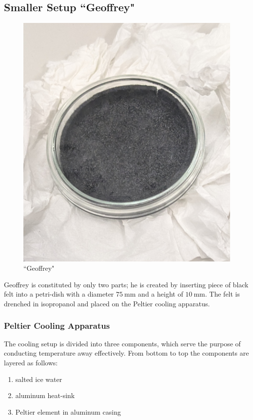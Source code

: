 \documentclass[10pt,a4paper]{article}
\begin{document}
\subsection{Smaller Setup ``Geoffrey"}
\begin{figure}
    \vspace{-\baselineskip}
    \includegraphics[width=1\linewidth]{images/Geoffrey top down.png}
    \caption{``Geoffrey"}
    \label{fig:geoffrey}
\end{figure}

Geoffrey is constituted by only two parts; he is created by inserting piece of black felt into a petri-dish with a diameter \(\qty{75}{\milli\meter}\) and a height of \(\qty{10}{\milli\meter}\). The felt is drenched in isopropanol and placed on the Peltier cooling apparatus. 


\subsubsection{Peltier Cooling Apparatus}
The cooling setup is divided into three components, which serve the purpose of conducting temperature away effectively. From bottom to top the components are layered as follows:
\begin{enumerate}
    \item salted ice water
    \item aluminum heat-sink
    \item Peltier element in aluminum casing 
\end{enumerate} 
\end{document}
